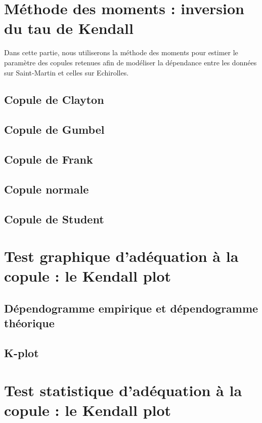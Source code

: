 \section{Méthode des moments : inversion du tau de Kendall}

Dans cette partie, nous utiliserons la méthode des moments pour estimer le paramètre des copules retenues afin de modéliser la dépendance entre les données sur Saint-Martin et celles sur Echirolles.

\subsection{Copule de Clayton}

\subsection{Copule de Gumbel}

\subsection{Copule de Frank}

\subsection{Copule normale}

\subsection{Copule de Student}

\section{Test graphique d'adéquation à la copule : le Kendall plot}

\subsection{Dépendogramme empirique et dépendogramme théorique}

\subsection{K-plot}

\section{Test statistique d'adéquation à la copule : le Kendall plot}


